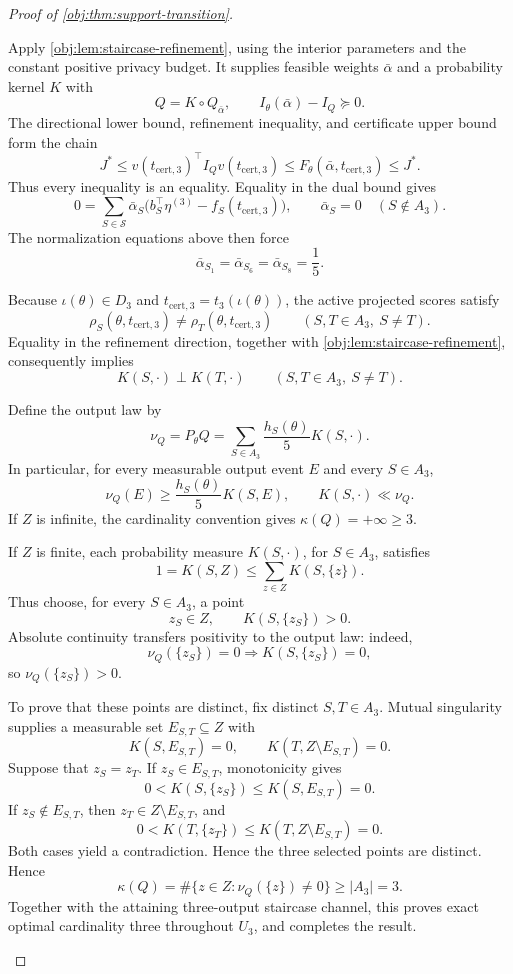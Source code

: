 \begin{proof}[Proof of \cref{obj:thm:support-transition}]
\begin{enumerate}
Apply \cref{obj:lem:staircase-refinement}, using the interior parameters and the constant positive privacy budget. It supplies feasible weights \(\bar\alpha\) and a probability kernel \(K\) with
\[
Q=K\circ Q_{\bar\alpha},
\qquad
I_\theta(\bar\alpha)-I_Q\succeq0.
\]
The directional lower bound, refinement inequality, and certificate upper bound form the chain
\[
J^*
\le v(t_{\mathrm{cert},3})^\top I_Qv(t_{\mathrm{cert},3})
\le F_\theta(\bar\alpha,t_{\mathrm{cert},3})
\le J^*.
\]
Thus every inequality is an equality. Equality in the dual bound gives
\[
0=\sum_{S\in\mathcal S}\bar\alpha_S
 \bigl(b_S^\top\eta^{(3)}-f_S(t_{\mathrm{cert},3})\bigr),
\qquad
\bar\alpha_S=0\quad(S\notin A_3).
\]
The normalization equations above then force
\[
\bar\alpha_{S_1}=\bar\alpha_{S_6}=\bar\alpha_{S_8}=\frac15.
\]

Because \(\iota(\theta)\in D_3\) and
\(t_{\mathrm{cert},3}=t_3(\iota(\theta))\), the active projected scores satisfy
\[
\rho_S(\theta,t_{\mathrm{cert},3})
\ne\rho_T(\theta,t_{\mathrm{cert},3})
\qquad(S,T\in A_3,\ S\ne T).
\]
Equality in the refinement direction, together with
\cref{obj:lem:staircase-refinement}, consequently implies
\[
K(S,\cdot)\perp K(T,\cdot)
\qquad(S,T\in A_3,\ S\ne T).
\]

Define the output law by
\[
\nu_Q=P_\theta Q
=\sum_{S\in A_3}\frac{h_S(\theta)}5K(S,\cdot).
\]
In particular, for every measurable output event \(E\) and every \(S\in A_3\),
\[
\nu_Q(E)\ge\frac{h_S(\theta)}5K(S,E),
\qquad
K(S,\cdot)\ll\nu_Q.
\]
If \(Z\) is infinite, the cardinality convention gives
\(\kappa(Q)=+\infty\ge3\).

If \(Z\) is finite, each probability measure \(K(S,\cdot)\), for \(S\in A_3\), satisfies
\[
1=K(S,Z)\le\sum_{z\in Z}K(S,\{z\}).
\]
Thus choose, for every \(S\in A_3\), a point
\[
z_S\in Z,\qquad K(S,\{z_S\})>0.
\]
Absolute continuity transfers positivity to the output law: indeed,
\[
\nu_Q(\{z_S\})=0\Longrightarrow K(S,\{z_S\})=0,
\]
so \(\nu_Q(\{z_S\})>0\).

To prove that these points are distinct, fix distinct \(S,T\in A_3\). Mutual singularity supplies a measurable set \(E_{S,T}\subseteq Z\) with
\[
K(S,E_{S,T})=0,\qquad K(T,Z\setminus E_{S,T})=0.
\]
Suppose that \(z_S=z_T\). If \(z_S\in E_{S,T}\), monotonicity gives
\[
0<K(S,\{z_S\})\le K(S,E_{S,T})=0.
\]
If \(z_S\notin E_{S,T}\), then \(z_T\in Z\setminus E_{S,T}\), and
\[
0<K(T,\{z_T\})\le K(T,Z\setminus E_{S,T})=0.
\]
Both cases yield a contradiction. Hence the three selected points are distinct. Hence
\[
\kappa(Q)
=\#\{z\in Z:\nu_Q(\{z\})\ne0\}
\ge |A_3|=3.
\]
Together with the attaining three-output staircase channel, this proves exact optimal cardinality three throughout \(U_3\), and completes the result.
\end{enumerate}
\end{proof}

